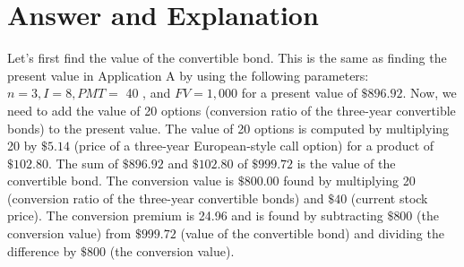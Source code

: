 \documentclass[11pt]{article}
\begin{document}
\section*{Answer and Explanation}
Let's first find the value of the convertible bond. This is the same as finding the present value in Application A by using the following parameters: $n=3, I=8, P M T=$ 40 , and $F V=1,000$ for a present value of $\$ 896.92$. Now, we need to add the value of 20 options (conversion ratio of the three-year convertible bonds) to the present value. The value of 20 options is computed by multiplying 20 by $\$ 5.14$ (price of a three-year European-style call option) for a product of $\$ 102.80$. The sum of $\$ 896.92$ and $\$ 102.80$ of $\$ 999.72$ is the value of the convertible bond. The conversion value is $\$ 800.00$ found by multiplying 20 (conversion ratio of the three-year convertible bonds) and $\$ 40$ (current stock price). The conversion premium is 24.96 and is found by subtracting $\$ 800$ (the conversion value) from $\$ 999.72$ (value of the convertible bond) and dividing the difference by $\$ 800$ (the conversion value).
\end{document}
